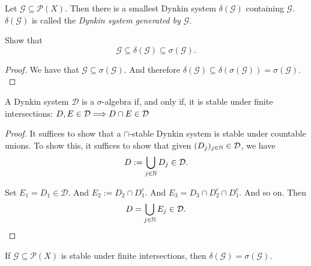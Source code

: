 \begin{defn}
Let \(\mathcal{G}\subseteq \mathcal{P}(X).\) Then there is a smallest Dynkin system \(\delta (\mathcal{G})\) containing \(\mathcal{G}\). \(\delta (\mathcal{G})\) is called the \emph{Dynkin system generated by \(\mathcal{G}\)}.
\end{defn}

\begin{prop}
Show that
\[
\mathcal{G}\subseteq \delta (\mathcal{G})\subseteq \sigma (\mathcal{G}).
\]
\end{prop}

\begin{proof}
We have that \(\mathcal{G}\subseteq \sigma (\mathcal{G})\). And therefore \(\delta (\mathcal{G})\subseteq \delta (\sigma (\mathcal{G}))=\sigma (\mathcal{G}).\)
\end{proof}

\begin{thm}
A Dynkin system \(\mathcal{D}\) is a \(\sigma \)-algebra if, and only if, it is stable under finite intersections: \(D,E\in \mathcal{D}\space \Longrightarrow \space D\cap E\in \mathcal{D}\)
\end{thm}

\begin{proof}
It suffices to show that a \(\cap \)-stable Dynkin system is stable under countable unions. To show this, it suffices to show that given $(D_{j})_{j\in \Bbb{N}}\in \mathcal{D}$, we have
\[
D:=\bigcup _{j\in \Bbb{N}}D_{j}\in \mathcal{D}.
\]

Set \(E_{1}=D_{1}\in \mathcal{D}\). And \(E_{2}:=D_{2}\cap D_{1}^c.\) And \(E_{3}=D_{3}\cap D_{2}^c\cap D_{1}^c\). And so on. Then
\[
D=\bigcup _{j\in \Bbb{N}}E_{j}\in \mathcal{D}.
\]
\end{proof}

\begin{thm}
If \(\mathcal{G}\subseteq \mathcal{P}(X)\) is stable under finite intersections, then \(\delta (\mathcal{G})=\sigma (\mathcal{G}).\)
\end{thm}

